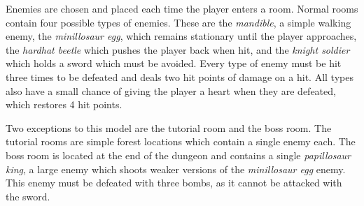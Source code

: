 \documentclass[a4paper]{article}
\begin{document}
\begin{multicols*}{2}
Enemies are chosen and placed each time the player enters a room. Normal rooms contain four possible types of enemies. These are the \emph{mandible}, a simple walking enemy, the \emph{minillosaur egg}, which remains stationary until the player approaches, the \emph{hardhat beetle} which pushes the player back when hit, and the \emph{knight soldier} which holds a sword which must be avoided. Every type of enemy must be hit three times to be defeated and deals two hit points of damage on a hit. All types also have a small chance of giving the player a heart when they are defeated, which restores 4 hit points.

Two exceptions to this model are the tutorial room and the boss room. The tutorial rooms are simple forest locations which contain a single enemy each. The boss room is located at the end of the dungeon and contains a single \emph{papillosaur king}, a large enemy which shoots weaker versions of the \emph{minillosaur egg} enemy. This enemy must be defeated with three bombs, as it cannot be attacked with the sword.


\end{multicols*}
\end{document}
